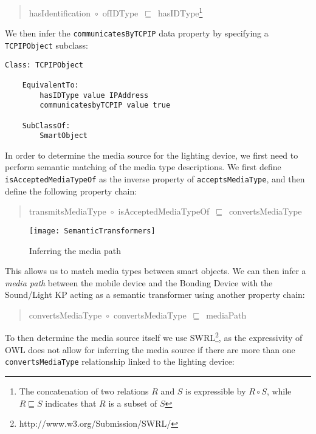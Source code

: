 \begin{quote}
hasIdentification~\ensuremath{\circ}~ofIDType~\ensuremath{\sqsubseteq}~hasIDType\footnote{The concatenation of two relations $R$ and $S$ is expressible by $R \circ S $, while $ R \sqsubseteq S$ indicates that $R$ is a subset of $S$ }
\end{quote}

\noindent We then infer the \texttt{communicatesByTCPIP} data property by specifying a \texttt{TCPIPObject} subclass:

\begin{verbatim}
Class: TCPIPObject

    EquivalentTo:
        hasIDType value IPAddress 
        communicatesbyTCPIP value true

    SubClassOf:
        SmartObject 
\end{verbatim}

In order to determine the media source for the lighting device, we first need to  perform semantic matching of the media type descriptions. We first define \texttt{isAccepted\-MediaTypeOf} as the inverse property of \texttt{acceptsMediaType}, and then define the following property chain:

\begin{quote}
transmitsMediaType~\ensuremath{\circ}~isAcceptedMediaTypeOf~\ensuremath{\sqsubseteq}~convertsMediaType
\end{quote}

\begin{figure}
\centering
\texttt{[image: SemanticTransformers]}
\caption{Inferring the media path}
\label{mediapath}
\end{figure}

This allows us to match media types between smart objects. We can then infer a \textit{media path} between the mobile device and the Bonding Device with the Sound/Light KP acting as a semantic transformer using another property chain:

\begin{quote}
convertsMediaType~\ensuremath{\circ}~convertsMediaType~\ensuremath{\sqsubseteq}~mediaPath
\end{quote}

\noindent To then determine the media source itself we use \ac{SWRL}\footnote{http://www.w3.org/Submission/SWRL/}, as the expressivity of \ac{OWL} does not allow for inferring the media source if there are more than one \texttt{convertsMediaType} relationship linked to the lighting device:\\


